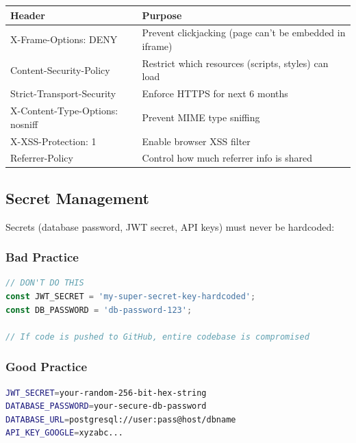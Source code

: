 \documentclass[12pt,a4paper,oneside]{article}
\begin{document}
\begin{table}[H]
\centering
\small
\begin{tabular}{|p{2.8cm}|p{8.2cm}|}
\hline
\textbf{Header} & \textbf{Purpose} \\
\hline
X-Frame-Options: DENY & Prevent clickjacking (page can't be embedded in iframe) \\
\hline
Content-Security-Policy & Restrict which resources (scripts, styles) can load \\
\hline
Strict-Transport-Security & Enforce HTTPS for next 6 months \\
\hline
X-Content-Type-Options: nosniff & Prevent MIME type sniffing \\
\hline
X-XSS-Protection: 1 & Enable browser XSS filter \\
\hline
Referrer-Policy & Control how much referrer info is shared \\
\hline
\end{tabular}
\end{table}

\subsection{Secret Management}

Secrets (database password, JWT secret, API keys) must never be hardcoded:

\subsubsection{Bad Practice}

\begin{lstlisting}[language=JavaScript, caption=INSECURE Secret Management]
// DON'T DO THIS
const JWT_SECRET = 'my-super-secret-key-hardcoded';
const DB_PASSWORD = 'db-password-123';

// If code is pushed to GitHub, entire codebase is compromised
\end{lstlisting}

\subsubsection{Good Practice}

\begin{lstlisting}[language=bash, caption=.env File (Never commit to git)]
JWT_SECRET=your-random-256-bit-hex-string
DATABASE_PASSWORD=your-secure-db-password
DATABASE_URL=postgresql://user:pass@host/dbname
API_KEY_GOOGLE=xyzabc...
\end{lstlisting}
\end{document}
